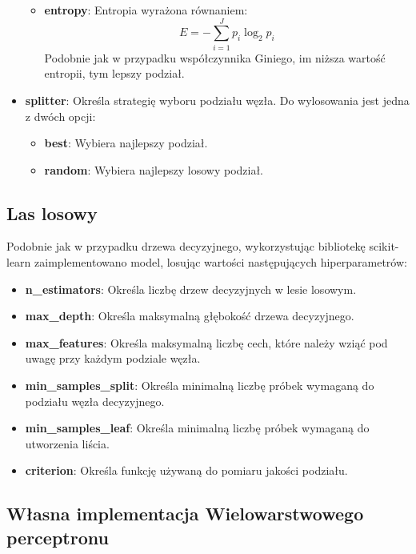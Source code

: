 \documentclass{article}
\begin{document}
\begin{itemize}
\begin{itemize}
        \item \textbf{entropy}: Entropia wyrażona równaniem:
        \begin{equation}
            E = -\sum_{i=1}^{J}p_i\log_2{p_i}
        \end{equation}
        Podobnie jak w przypadku współczynnika Giniego, im niższa
        wartość entropii, tym lepszy podział.
    \end{itemize}
    \item \textbf{splitter}: Określa strategię 
    wyboru podziału węzła. Do wylosowania jest
    jedna z dwóch opcji:
    \begin{itemize}
        \item \textbf{best}: Wybiera najlepszy podział.
        \item \textbf{random}: Wybiera najlepszy losowy podział.
    \end{itemize}

\end{itemize}

\subsection{Las losowy}

Podobnie jak w przypadku drzewa decyzyjnego, wykorzystując bibliotekę
scikit-learn zaimplementowano model, losując wartości
następujących hiperparametrów:

\begin{itemize}
    \item \textbf{n\_estimators}: Określa liczbę drzew decyzyjnych
    w lesie losowym.
    \item \textbf{max\_depth}: Określa maksymalną głębokość drzewa
    decyzyjnego.
    \item \textbf{max\_features}: Określa maksymalną liczbę cech,
    które należy wziąć pod uwagę przy każdym podziale węzła.
    \item \textbf{min\_samples\_split}: Określa minimalną liczbę
    próbek wymaganą do podziału węzła decyzyjnego.
    \item \textbf{min\_samples\_leaf}: Określa minimalną liczbę
    próbek wymaganą do utworzenia liścia.
    \item \textbf{criterion}: Określa funkcję używaną do pomiaru
    jakości podziału.
\end{itemize}

\subsection{Własna implementacja Wielowarstwowego perceptronu}
\end{document}
